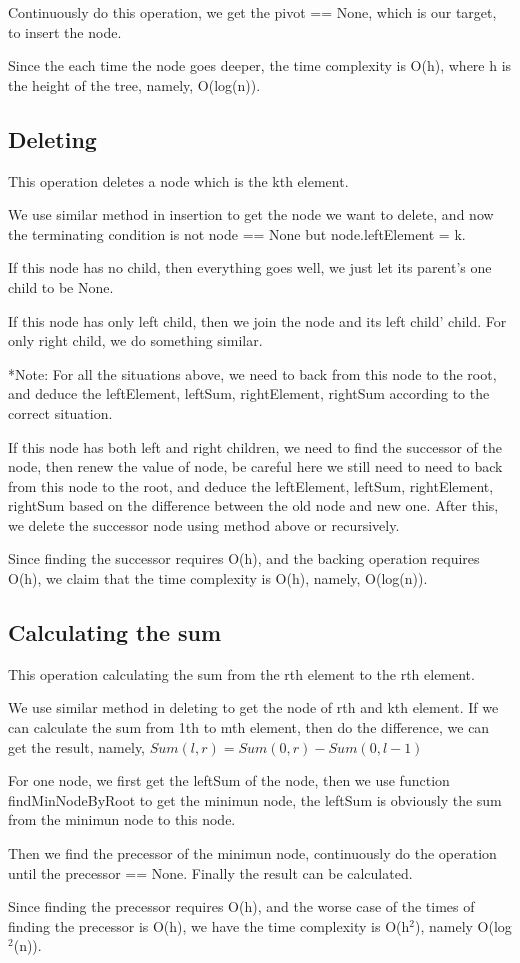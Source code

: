 Continuously do this operation, we get the pivot == None, which is our target, to insert the node.

Since the each time the node goes deeper, the time complexity is O(h), where h is the height of the tree, namely, O(log(n)).

\subsection{Deleting}
This operation deletes a node which is the kth element.

We use similar method in insertion to get the node we want to delete, and now the terminating condition is not node == None but node.leftElement = k.

If this node has no child, then everything goes well, we just let its parent's one child to be None.

If this node has only left child, then we join the node and its left child' child. For only right child, we do something similar.

*Note: For all the situations above, we need to back from this node to the root, and deduce the leftElement, leftSum, rightElement, rightSum according to the correct situation.

If this node has both left and right children, we need to find the successor of the node, then renew the value of node, be careful here we still need to need to back from this node to the root, and deduce the leftElement, leftSum, rightElement, rightSum based on the difference between the old node and new one. After this, we delete the successor node using method above or recursively.

Since finding the successor requires O(h), and the backing operation requires O(h), we claim that the time complexity is O(h), namely, O(log(n)).

\subsection{Calculating the sum}
This operation calculating the sum from the rth element to the rth element.

We use similar method in deleting to get the node of rth and kth element. If we can calculate the sum from 1th to mth element, then do the difference, we can get the result, namely, $Sum(l, r) = Sum(0, r) - Sum(0,l-1)$

For one node, we first get the leftSum of the node, then we use function findMinNodeByRoot to get the minimun node, the leftSum is obviously the sum from the minimun node to this node.

Then we find the precessor of the minimun node, continuously do the operation until the precessor == None. Finally the result can be calculated.

Since finding the precessor requires O(h), and the worse case of the times of finding the precessor is O(h), we have the time complexity is O(h$^2$), namely O(log$^2$(n)).